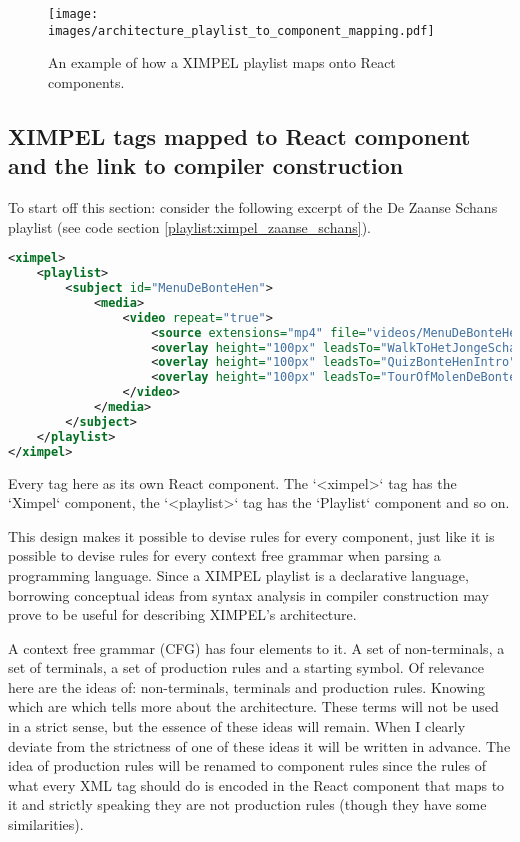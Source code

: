 \begin{figure}
\texttt{[image: images/architecture\_playlist\_to\_component\_mapping.pdf]} %
\caption{An example of how a XIMPEL playlist maps onto React components.}
\label{images:architecture_playlist_to_component_mapping}
\end{figure}

\subsection{XIMPEL tags mapped to React component and the link to compiler construction}
To start off this section: consider the following excerpt of the De Zaanse Schans playlist (see code section \ref{playlist:ximpel_zaanse_schans}).

\begin{lstlisting}[language=XML, caption=An excerpt of the De Zaanse Schans playlist., label=playlist:ximpel_zaanse_schans]
<ximpel>
    <playlist>
        <subject id="MenuDeBonteHen">
            <media>
                <video repeat="true">
                    <source extensions="mp4" file="videos/MenuDeBonteHen"/>
                    <overlay height="100px" leadsTo="WalkToHetJongeSchaap" width="350px" x="200px" y="970px"/>
                    <overlay height="100px" leadsTo="QuizBonteHenIntro" width="350px" x="800px" y="970px"/>
                    <overlay height="100px" leadsTo="TourOfMolenDeBonteHen" width="350px" x="1470px" y="970px"/>
                </video>
            </media>
        </subject>
    </playlist>
</ximpel>
\end{lstlisting}

Every tag here as its own React component. The `<ximpel>` tag has the `Ximpel` component, the `<playlist>` tag has the `Playlist` component and so on. 

This design makes it possible to devise rules for every component, just like it is possible to devise rules for every context free grammar when parsing a programming language. Since a XIMPEL playlist is a declarative language, borrowing conceptual ideas from syntax analysis in compiler construction may prove to be useful for describing XIMPEL's architecture.

A context free grammar (CFG) has four elements to it. A set of non-terminals, a set of terminals, a set of production rules and a starting symbol. Of relevance here are the ideas of: non-terminals, terminals and production rules. Knowing which are which tells more about the architecture. These terms will not be used in a strict sense, but the essence of these ideas will remain. When I clearly deviate from the strictness of one of these ideas it will be written in advance. The idea of production rules will be renamed to component rules since the rules of what every XML tag should do is encoded in the React component that maps to it and strictly speaking they are not production rules (though they have some similarities).

